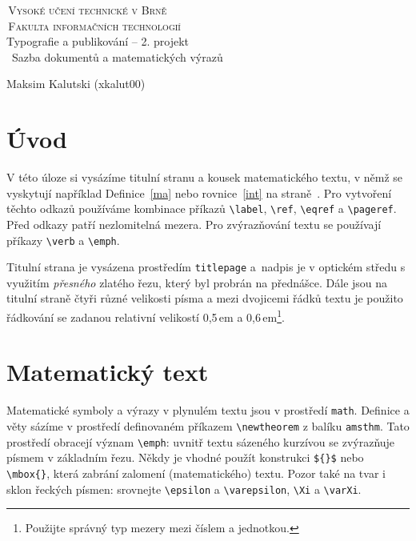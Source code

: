 \documentclass[11pt, a4paper, twocolumn]{article}
\begin{document}
\begin{titlepage}
    \begin{center}
    {\Huge\textsc{\,Vysoké učení technické v Brně}}\\[0.8em]
    {\huge \textsc{\,Fakulta informačních technologií}}
    {\LARGE \\Typografie a publikování -- 2. projekt \\[0.5em]\ Sazba dokumentů a matematických výrazů}
    \end{center}
    {\Large \the\year \hfill Maksim Kalutski (xkalut00)}

\end{titlepage}
\clearpage

\section*{Úvod}

V této úloze si vysázíme titulní stranu a kousek matematického textu, v němž se vyskytují například Definice~\ref{ma} nebo rovnice~\eqref{int} na straně~\pageref{int}. Pro vytvoření těchto odkazů používáme kombinace příkazů \verb|\label|, \verb|\ref|, \verb|\eqref| a \verb|\pageref|. Před odkazy patří nezlomitelná mezera. Pro zvýrazňování textu se používají příkazy \verb|\verb| a \verb|\emph|.

Titulní strana je vysázena prostředím \verb|titlepage| a~nadpis je v optickém středu s využitím \emph{přesného} zlatého řezu, který byl probrán na přednášce. Dále jsou na titulní straně čtyři různé velikosti písma a mezi dvojicemi řádků textu je použito řádkování se zadanou relativní velikostí 0,5\,em a 0,6\,em\footnote{Použijte správný typ mezery mezi číslem a jednotkou.}.

\section{Matematický text}
Matematické symboly a výrazy v plynulém textu jsou v prostředí \verb|math|. Definice a věty sázíme v prostředí definovaném příkazem \verb|\newtheorem| z balíku \verb|amsthm|. Tato prostředí obracejí význam \verb|\emph|: uvnitř textu sázeného kurzívou se zvýrazňuje písmem v základním řezu. Někdy je vhodné použít konstrukci  \verb|${}$| nebo \verb|\mbox{}|, která zabrání zalomení (matematického) textu. Pozor také na tvar i sklon řeckých písmen: srovnejte \verb|\epsilon| a \verb|\varepsilon|, \verb|\Xi| a \verb|\varXi|.
\end{document}
